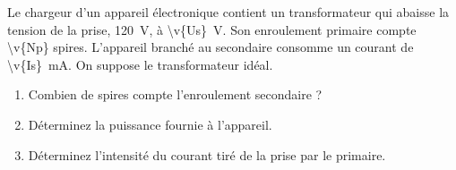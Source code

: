 Le chargeur d'un appareil électronique contient un transformateur qui abaisse la tension de la prise, \qty{120}{V}, à \qty{\v{Us}}{V}. Son enroulement primaire compte \num{\v{Np}} spires. L'appareil branché au secondaire consomme un courant de \qty{\v{Is}}{mA}. On suppose le transformateur idéal.

\begin{enumerate}[label=\alph*)]
    \item Combien de spires compte l'enroulement secondaire ?
    \item Déterminez la puissance fournie à l'appareil.
    \item Déterminez l'intensité du courant tiré de la prise par le primaire.
\end{enumerate}

